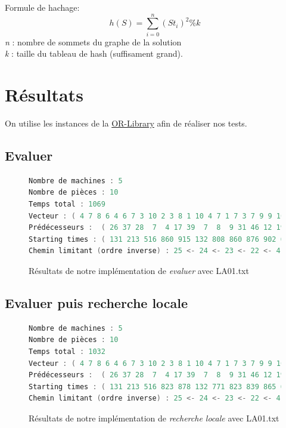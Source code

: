 \documentclass{article}
\begin{document}
Formule de hachage:
$$
h(S) = \sum_{i = 0}^n (St_i)^2 \% k
$$
\emph{n} : nombre de sommets du graphe de la solution\\
\emph{k} : taille du tableau de hash (suffisament grand).

\section{Résultats}

On utilise les instances de la \href{http://people.brunel.ac.uk/~mastjjb/jeb/orlib/files/jobshop1.txt}{OR-Library}
afin de réaliser nos tests.

\subsection{Evaluer}

\begin{figure}[!ht]
\caption{Résultats de notre implémentation de \emph{evaluer} avec LA01.txt}
\begin{lstlisting}[language=c++]
Nombre de machines : 5
Nombre de pièces : 10
Temps total : 1069
Vecteur : ( 4 7 8 6 4 6 7 3 10 2 3 8 1 10 4 7 1 7 3 7 9 9 10 10 9 9 9 4 4 6 6 1 8 6 10 3 8 2 2 3 2 2 1 5 5 8 1 5 5 5 )
Prédécesseurs :  ( 26 37 28  7  4 17 39  7  8  9 31 46 12 19 50 -1 16 12 45 19 15  4 22 23 24 16 26 43 28 20 -1 31  1 33 34 -1  6 49 30  8 47 13 42 43 44 32 46 34 42 29 )
Starting times : ( 131 213 516 860 915 132 808 860 876 902 69 223 321 645 704  0 77 321 579 645 716 915 949 1013 1032 77 131 437 516 722  0 69 152 239 326  0 153 487 784 876 302 363 412 437 481 146 223 326 412 608 )
Chemin limitant (ordre inverse) : 25 <- 24 <- 23 <- 22 <- 4 <- 7 <- 39 <- 30 <- 20 <- 19 <- 45 <- 44 <- 43 <- 42 <- 13 <- 12 <- 46 <- 32 <- 31
\end{lstlisting}
\end{figure}

\subsection{Evaluer puis recherche locale}

\begin{figure}[!ht]
\caption{Résultats de notre implémentation de \emph{recherche locale} avec LA01.txt}
\begin{lstlisting}[language=c++]
Nombre de machines : 5
Nombre de pièces : 10
Temps total : 1032
Vecteur : ( 4 7 8 6 4 6 7 3 10 2 3 8 1 10 4 7 1 7 3 7 9 9 10 10 9 9 9 4 6 6 6 1 8 4 10 3 8 2 2 3 2 2 1 5 5 8 1 5 5 5 )
Prédécesseurs :  ( 26 37 28  7  4 17 39  7  8  9 31 46 12 19 50 -1 16 12 45 30 15  4 22 23 24 16 26 43 28 29 -1 31  1 33 34 -1  6 49 20  8 47 13 42 43 44 32 46 34 42 29 )
Starting times : ( 131 213 516 823 878 132 771 823 839 865 69 223 321 645 704  0 77 321 579 670 716 878 912 976 995 77 131 437 516 608  0 69 152 239 326  0 153 487 747 839 302 363 412 437 481 146 223 326 412 608 )
Chemin limitant (ordre inverse) : 25 <- 24 <- 23 <- 22 <- 4 <- 7 <- 39 <- 20 <- 30 <- 29 <- 28 <- 43 <- 42 <- 13 <- 12 <- 46 <- 32 <- 31
\end{lstlisting}
\end{figure}
\end{document}
